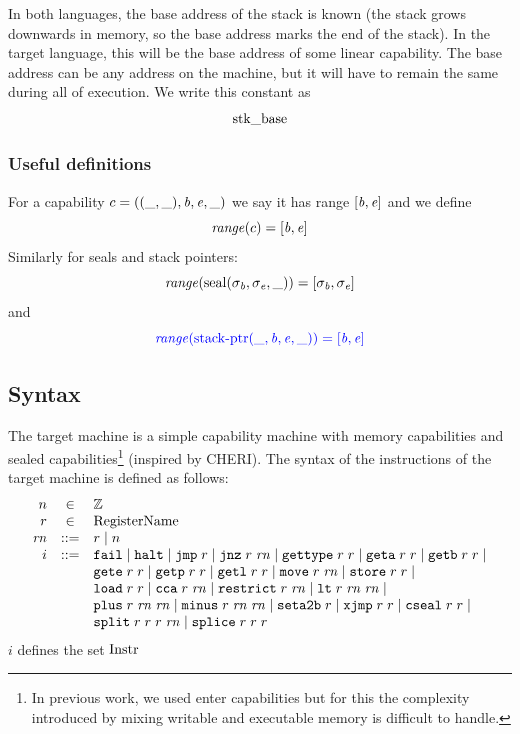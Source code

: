 \documentclass[a4paper]{article}
\begin{document}
 In both languages, the base address of the stack is known (the stack grows downwards in memory, so the base address marks the end of the stack). In the target language, this will be the base address of some linear capability. The base address can be any address on the machine, but it will have to remain the same during all of execution. We write this constant as
\[
  \mathrm{stk\_base}
\]


\subsubsection{Useful definitions}
\begin{definition}
  For a capability $c=((\_,\_),\mathit{b},\mathit{e},\_)$ we say it has range $[\mathit{b},\mathit{e}]$ and we define
  \[
    \range{c} = [\baddr,\eaddr]
  \]
  Similarly for seals and stack pointers:
  \[
    \range{\seal{\sigma_\baddr,\sigma_\eaddr,\_}} = [\sigma_\baddr,\sigma_\eaddr]
  \]
  and
  \[
    \src{\range{\stkptr{\_,\baddr,\eaddr,\_}} = [\baddr,\eaddr]}
  \]
\end{definition}

\subsection{Syntax}
\label{sec:syntax}
The target machine is a simple capability machine with memory capabilities and sealed capabilities\footnote{In previous work, we used enter capabilities but for this the complexity introduced by mixing writable and executable memory is difficult to handle.} (inspired by CHERI). The syntax of the instructions of the target machine is defined as follows:
\[
\begin{array}{rcl}
n &\in & \ints \\
\com{r} &\in &  \tRegName \\
\com{\rn} &\defbnf &  \com{r} \mid n \\
\com{i} &\defbnf & \tfail \mid \thalt \mid \tjmp{\com{r}} \mid \tjnz{\com{r}}{\com{\rn}} \mid \tisptr{\com{r}}{\com{r}} \mid \tgeta{\com{r}}{\com{r}} \mid \tgetb{\com{r}}{\com{r}} \mid \\
      & &  \tgete{\com{r}}{\com{r}}\mid \tgetp{\com{r}}{\com{r}} \mid \tgetlin{\com{r}}{\com{r}} \mid \tmove{\com{r}}{\com{\rn}} \mid \tstore{\com{r}}{\com{r}} \mid\\
      & &  \tload{\com{r}}{\com{r}} \mid \tcca{\com{r}}{\com{\rn}} \mid \trestrict{\com{r}}{\com{\rn}} \mid \tlt{\com{r}}{\com{\rn}}{\com{\rn}} \mid \\
  & & \tplus{\com{r}}{\com{\rn}}{\com{\rn}} \mid \tminus{\com{r}}{\com{\rn}}{\com{\rn}} \mid \tsetatob{\com{r}} \mid \txjmp{\com{r}}{\com{r}} \mid \tcseal{\com{r}}{\com{r}} \mid \\ 
      & &   \tsplit{\com{r}}{\com{r}}{\com{r}}{\com{\rn}} \mid\tsplice{\com{r}}{\com{r}}{\com{r}} 
\end{array}
\]
$i$ defines the set $\mathrm{Instr}$
\end{document}
